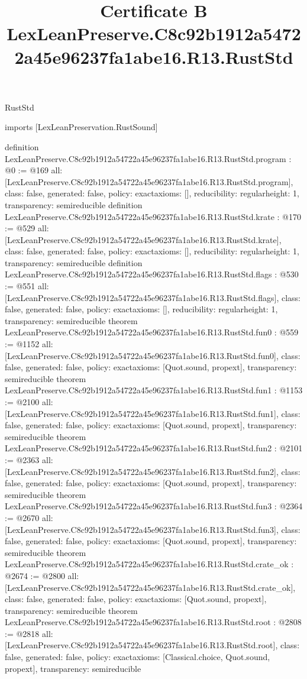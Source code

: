 \begin{lexlean}{RustStd}
\title{Certificate B LexLeanPreserve.C8c92b1912a54722a45e96237fa1abe16.R13.RustStd}
\begin{coremodule}
imports [LexLeanPreservation.RustSound]

definition LexLeanPreserve.C8c92b1912a54722a45e96237fa1abe16.R13.RustStd.program : @0 := @169 {
  all: [LexLeanPreserve.C8c92b1912a54722a45e96237fa1abe16.R13.RustStd.program],
  class: false,
  generated: false,
  policy: exact{axioms: []},
  reducibility: regular{height: 1},
  transparency: semireducible
}
definition LexLeanPreserve.C8c92b1912a54722a45e96237fa1abe16.R13.RustStd.krate : @170 := @529 {
  all: [LexLeanPreserve.C8c92b1912a54722a45e96237fa1abe16.R13.RustStd.krate],
  class: false,
  generated: false,
  policy: exact{axioms: []},
  reducibility: regular{height: 1},
  transparency: semireducible
}
definition LexLeanPreserve.C8c92b1912a54722a45e96237fa1abe16.R13.RustStd.flags : @530 := @551 {
  all: [LexLeanPreserve.C8c92b1912a54722a45e96237fa1abe16.R13.RustStd.flags],
  class: false,
  generated: false,
  policy: exact{axioms: []},
  reducibility: regular{height: 1},
  transparency: semireducible
}
theorem LexLeanPreserve.C8c92b1912a54722a45e96237fa1abe16.R13.RustStd.fun0 : @559 := @1152 {
  all: [LexLeanPreserve.C8c92b1912a54722a45e96237fa1abe16.R13.RustStd.fun0],
  class: false,
  generated: false,
  policy: exact{axioms: [Quot.sound, propext]},
  transparency: semireducible
}
theorem LexLeanPreserve.C8c92b1912a54722a45e96237fa1abe16.R13.RustStd.fun1 : @1153 := @2100 {
  all: [LexLeanPreserve.C8c92b1912a54722a45e96237fa1abe16.R13.RustStd.fun1],
  class: false,
  generated: false,
  policy: exact{axioms: [Quot.sound, propext]},
  transparency: semireducible
}
theorem LexLeanPreserve.C8c92b1912a54722a45e96237fa1abe16.R13.RustStd.fun2 : @2101 := @2363 {
  all: [LexLeanPreserve.C8c92b1912a54722a45e96237fa1abe16.R13.RustStd.fun2],
  class: false,
  generated: false,
  policy: exact{axioms: [Quot.sound, propext]},
  transparency: semireducible
}
theorem LexLeanPreserve.C8c92b1912a54722a45e96237fa1abe16.R13.RustStd.fun3 : @2364 := @2670 {
  all: [LexLeanPreserve.C8c92b1912a54722a45e96237fa1abe16.R13.RustStd.fun3],
  class: false,
  generated: false,
  policy: exact{axioms: [Quot.sound, propext]},
  transparency: semireducible
}
theorem LexLeanPreserve.C8c92b1912a54722a45e96237fa1abe16.R13.RustStd.crate_ok : @2674 := @2800 {
  all: [LexLeanPreserve.C8c92b1912a54722a45e96237fa1abe16.R13.RustStd.crate_ok],
  class: false,
  generated: false,
  policy: exact{axioms: [Quot.sound, propext]},
  transparency: semireducible
}
theorem LexLeanPreserve.C8c92b1912a54722a45e96237fa1abe16.R13.RustStd.root : @2808 := @2818 {
  all: [LexLeanPreserve.C8c92b1912a54722a45e96237fa1abe16.R13.RustStd.root],
  class: false,
  generated: false,
  policy: exact{axioms: [Classical.choice, Quot.sound, propext]},
  transparency: semireducible
}


\end{coremodule}
\end{lexlean}
